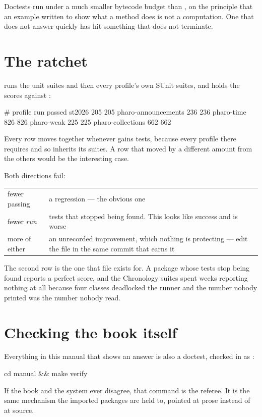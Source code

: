 Doctests run under a much smaller bytecode budget than , on the
principle that an example written to show what a method does is not a
computation. One that does not answer quickly has hit something that does not
terminate.

\section{The ratchet}

 runs the unit suites and then every profile's own SUnit suites,
and holds the scores against :

\begin{plain}
# profile               run  passed
st2026                  205  205
pharo-announcements     236  236
pharo-time              826  826
pharo-weak              225  225
pharo-collections       662  662
\end{plain}

Every row moves together whenever  gains tests, because every profile
there requires  and so inherits its suites. A row that moved by a
different amount from the others would be the interesting case.

Both directions fail:

\begin{center}
\small
\begin{tabular}{@{}lp{}@{}}
\toprule
fewer passing & a regression --- the obvious one\\
fewer \emph{run} & tests that stopped being found. This looks like success and
  is worse\\
more of either & an unrecorded improvement, which nothing is protecting ---
  edit the file in the same commit that earns it\\
\bottomrule
\end{tabular}
\end{center}

The second row is the one that file exists for. A package whose tests stop
being found reports a perfect score, and the Chronology suites spent weeks
reporting nothing at all because four classes deadlocked the runner and the
number nobody printed was the number nobody read.

\section{Checking the book itself}

Everything in this manual that shows an answer is also a doctest, checked in
as :

\begin{sh}
cd manual && make verify
\end{sh}

If the book and the system ever disagree, that command is the referee. It is
the same mechanism the imported packages are held to, pointed at prose instead
of at source.

